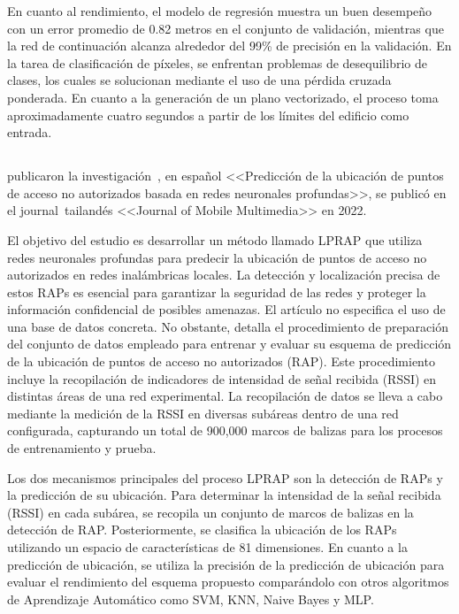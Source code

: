 En cuanto al rendimiento, el modelo de regresión muestra un buen desempeño con un error promedio de 0.82 metros en el conjunto de validación, mientras que la red de continuación alcanza alrededor del 99\% de precisión en la validación. En la tarea de clasificación de píxeles, se enfrentan problemas de desequilibrio de clases, los cuales se solucionan mediante el uso de una pérdida cruzada ponderada. En cuanto a la generación de un plano vectorizado, el proceso toma aproximadamente cuatro segundos a partir de los límites del edificio como entrada.

\subsection{}
\cite{pr_ketkhaw2019deepl}  publicaron la investigación , en español <<Predicción de la ubicación de puntos de acceso no autorizados basada en redes neuronales profundas>>, se publicó en el journal tailandés <<Journal of Mobile Multimedia>> en 2022.

El objetivo del estudio es desarrollar un método llamado LPRAP que utiliza redes neuronales profundas para predecir la ubicación de puntos de acceso no autorizados en redes inalámbricas locales. La detección y localización precisa de estos RAPs es esencial para garantizar la seguridad de las redes y proteger la información confidencial de posibles amenazas. El artículo no especifica el uso de una base de datos concreta. No obstante, detalla el procedimiento de preparación del conjunto de datos empleado para entrenar y evaluar su esquema de predicción de la ubicación de puntos de acceso no autorizados (RAP). Este procedimiento incluye la recopilación de indicadores de intensidad de señal recibida (RSSI) en distintas áreas de una red experimental. La recopilación de datos se lleva a cabo mediante la medición de la RSSI en diversas subáreas dentro de una red configurada, capturando un total de 900,000 marcos de balizas para los procesos de entrenamiento y prueba.

Los dos mecanismos principales del proceso LPRAP son la detección de RAPs y la predicción de su ubicación. Para determinar la intensidad de la señal recibida (RSSI) en cada subárea, se recopila un conjunto de marcos de balizas en la detección de RAP. Posteriormente, se clasifica la ubicación de los RAPs utilizando un espacio de características de 81 dimensiones. En cuanto a la predicción de ubicación, se utiliza la precisión de la predicción de ubicación para evaluar el rendimiento del esquema propuesto comparándolo con otros algoritmos de Aprendizaje Automático como SVM, KNN, Naive Bayes y MLP.

